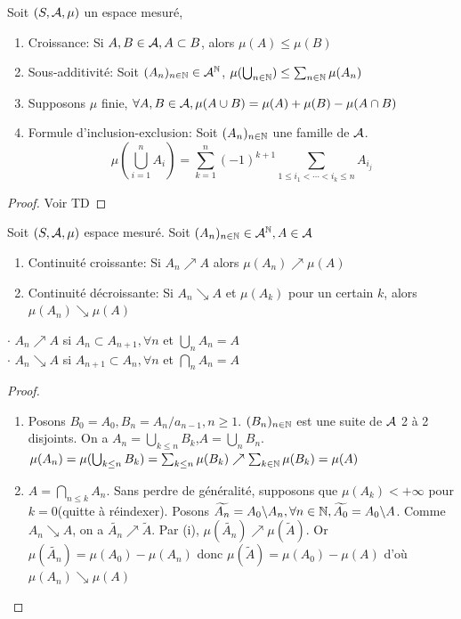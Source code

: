 \documentclass[]{report}
\begin{document}
    \begin{prop}{}{}
        Soit $(S,\mathcal{A},\mu)$ un espace mesuré,
        \begin{enumerate}
            \item Croissance: Si $A,B\in\mathcal{A},A\subset B$, alors $\mu(A)\le \mu(B)$
            \item Sous-additivité: Soit $(A_n)_{n\in\mathbb{N}}\in\mathcal{A}^{\mathbb{N}}$, $\mu(\bigcup_{n\in\mathbb{N}})\le\sum_{n\in\mathbb{N}}\mu(A_n)$
            \item Supposons $\mu$ finie, $\forall A,B\in\mathcal{A},\mu(A\cup B)=\mu(A)+\mu(B)-\mu(A\cap B)$
            \item Formule d'inclusion-exclusion: Soit $(A_n)_{n\in\mathbb{N}}$ une famille de $\mathcal{A}$.
            \[\mu\left(\bigcup_{i=1}^n A_i\right)=\sum_{k=1}^{n}(-1)^{k+1}\sum_{1\le i_1<\cdots<i_k\le n} A_{i_j}\]
        \end{enumerate}
    \end{prop}

    \begin{proof}{}{}
        Voir TD
    \end{proof}

    \begin{prop}{}{}
        Soit $(S,\mathcal{A},\mu)$ espace mesuré. Soit $(A_n)_{n\in\mathbb{N}}\in\mathcal{A}^{\mathbb{N}},A\in\mathcal{A}$
        \begin{enumerate}
            \item Continuité croissante: Si $A_n \nearrow A$ alors $\mu(A_n)\nearrow \mu(A)$
            \item Continuité décroissante: Si $A_n\searrow A$ et $\mu (A_k)$ pour un certain $k$, alors $\mu(A_n)\searrow\mu(A)$
        \end{enumerate}
        $\cdot$ $A_n \nearrow A$ si $A_n\subset A_{n+1},\forall n$ et $\bigcup_n A_n=A$\\
        $\cdot$ $A_n \searrow A$ si $A_{n+1}\subset A_{n},\forall n$ et $\bigcap_n A_n=A$
    \end{prop}

    \begin{proof}{}{}
        \begin{enumerate}
            \item Posons $B_0=A_0,B_n=A_n/a_{n-1},n\ge 1$. $(B_n)_{n\in\mathbb{N}}$ est une suite de $\mathcal{A}$ 2 à 2 disjoints. On a $A_n=\bigcup_{k\le n}B_k$,$A=\bigcup_{n} B_n$.\\
            $\mu(A_n)=\mu(\bigcup_{k\le n}B_k)=\sum_{k\le n}\mu(B_k)\nearrow \sum_{k\in\mathbb{N}}\mu(B_k)=\mu(A)$
            \item $A=\bigcap_{n\le k}A_n$. Sans perdre de généralité, supposons que $\mu(A_k)<+\infty$ pour $k=0$(quitte à réindexer). Posons $\widetilde{A_n}=A_0\backslash A_n,\forall n\in\mathbb{N},\widetilde{A_0}=A_0\backslash A$. Comme $A_n\searrow A$, on a $\widetilde{A_n}\nearrow \widetilde{A}$. Par (i), $\mu(\widetilde{A_n})\nearrow\mu(\widetilde{A})$. Or $\mu(\widetilde{A_n})=\mu(A_0)-\mu(A_n)$ donc $\mu(\widetilde{A})=\mu(A_0)-\mu(A)$ d'où $\mu(A_n)\searrow\mu(A)$
        \end{enumerate}
    \end{proof}
    
\end{document}
